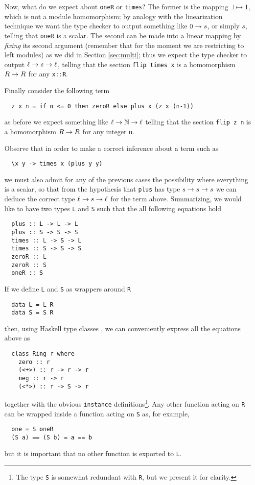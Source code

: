 Now, what do we expect about \lstinline{oneR} or \lstinline{times}?
The former is the mapping $\perp\mapsto1$, which is not a module
homomorphism; by analogy with the linearization technique we want the
type checker to output something like $0\rightarrow s$, or simply $s$, telling
that \lstinline{oneR} is a scalar. The second can be made into a
linear mapping by \emph{fixing} its second argument (remember that for
the moment we are restricting to left modules) as we did in Section
\ref{sec:multi}; thus we expect the type checker to output $\ell\rightarrow
s\rightarrow\ell$, telling that the section \lstinline{flip times x} is a
homomorphism $R\rightarrow R$ for any \lstinline{x::R}.

Finally consider the following term
\begin{lstlisting}
  z x n = if n <= 0 then zeroR else plus x (z x (n-1))
\end{lstlisting}
as before we expect something like $\ell\rightarrow\mathbb{N}\rightarrow\ell$ telling that the
section \lstinline{flip z n} is a homomorphism $R\rightarrow R$ for any
integer \lstinline{n}.

Observe that in order to make a correct inference about a term such as
\begin{lstlisting}
  \x y -> times x (plus y y)
\end{lstlisting}
we must also admit for any of the previous cases the possibility where
everything is a scalar, so that from the hypothesis that
\lstinline{plus} has type $s\rightarrow s\rightarrow s$ we can deduce the correct type
$\ell\rightarrow s\rightarrow\ell$ for the term above. Summarizing, we would like to
have two types \lstinline{L} and \lstinline{S} such that the all
following equations hold
\begin{lstlisting}
  plus :: L -> L -> L
  plus :: S -> S -> S
  times :: L -> S -> L
  times :: S -> S -> S
  zeroR :: L
  zeroR :: S
  oneR :: S
\end{lstlisting}

If we define \lstinline{L} and \lstinline{S} as wrappers around
\lstinline{R}
\begin{lstlisting}
  data L = L R
  data S = S R
\end{lstlisting}
then, using Haskell type classes \cite{WaBl89}, we can conveniently
express all the equations above as
\begin{lstlisting}
  class Ring r where
    zero :: r
    (<+>) :: r -> r -> r
    neg :: r -> r
    (<*>) :: r -> S -> r
\end{lstlisting}
together with the obvious \lstinline{instance}
definitions\footnote{The type \lstinline{S} is somewhat redundant with
  \lstinline{R}, but we present it for clarity.}. Any other function
acting on \lstinline{R} can be wrapped inside a function acting on
\lstinline{S} as, for example,
\begin{lstlisting}
  one = S oneR
  (S a) == (S b) = a == b
\end{lstlisting}
but it is important that no other function is exported to
\lstinline{L}.

